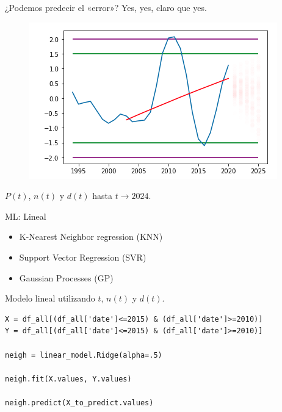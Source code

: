 \documentclass[10pt]{beamer}
\begin{document}
\begin{frame}{¿Podemos predecir el «error»? Yes, yes, claro que yes. }
\begin{figure}
\includegraphics[scale=0.3]{img/14.png}
\end{figure}
$P(t)$, $n(t)$ y $d(t)$ hasta $t\rightarrow 2024$.
\end{frame}

\begin{frame}[fragile]{ML: Lineal}
\begin{itemize}
\item K-Nearest Neighbor regression (KNN)
\item Support Vector Regression (SVR)
\item Gaussian Processes (GP)
\end{itemize}
Modelo lineal utilizando $t$, $n(t)$ y $d(t)$.
\begin{verbatim}
X = df_all[(df_all['date']<=2015) & (df_all['date']>=2010)]
Y = df_all[(df_all['date']<=2015) & (df_all['date']>=2010)]

neigh = linear_model.Ridge(alpha=.5)

neigh.fit(X.values, Y.values)

neigh.predict(X_to_predict.values)
\end{verbatim}
\end{frame}
\end{document}
